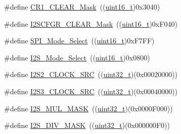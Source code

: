 \begin{DoxyCompactItemize}
\item 
\#define \hyperlink{group___s_p_i___private___defines_ga67f7dd35ea3d1296677e5fc50b88fa90}{C\+R1\+\_\+\+C\+L\+E\+A\+R\+\_\+\+Mask}~((\hyperlink{_p_e___types_8h_a1f1825b69244eb3ad2c7165ddc99c956}{uint16\+\_\+t})0x3040)
\item 
\#define \hyperlink{group___s_p_i___private___defines_ga6cd1ac4e83d8de8e32a407d1a7971389}{I2\+S\+C\+F\+G\+R\+\_\+\+C\+L\+E\+A\+R\+\_\+\+Mask}~((\hyperlink{_p_e___types_8h_a1f1825b69244eb3ad2c7165ddc99c956}{uint16\+\_\+t})0x\+F040)
\item 
\#define \hyperlink{group___s_p_i___private___defines_ga71da9dd90bf7bfb6ed1748a1e181677a}{S\+P\+I\+\_\+\+Mode\+\_\+\+Select}~((\hyperlink{_p_e___types_8h_a1f1825b69244eb3ad2c7165ddc99c956}{uint16\+\_\+t})0x\+F7\+F\+F)
\item 
\#define \hyperlink{group___s_p_i___private___defines_ga196b1b58421a7ee7dba0b46fb33c621b}{I2\+S\+\_\+\+Mode\+\_\+\+Select}~((\hyperlink{_p_e___types_8h_a1f1825b69244eb3ad2c7165ddc99c956}{uint16\+\_\+t})0x0800)
\item 
\#define \hyperlink{group___s_p_i___private___defines_gae1190efd6dbcd06a9c03f4d499d28e4c}{I2\+S2\+\_\+\+C\+L\+O\+C\+K\+\_\+\+S\+RC}~((\hyperlink{_p_e___types_8h_a33594304e786b158f3fb30289278f5af}{uint32\+\_\+t})(0x00020000))
\item 
\#define \hyperlink{group___s_p_i___private___defines_gabb67971448c15090f3372e3875db3d23}{I2\+S3\+\_\+\+C\+L\+O\+C\+K\+\_\+\+S\+RC}~((\hyperlink{_p_e___types_8h_a33594304e786b158f3fb30289278f5af}{uint32\+\_\+t})(0x00040000))
\item 
\#define \hyperlink{group___s_p_i___private___defines_gaf9cca755995c8e8f7a4012709ca468f2}{I2\+S\+\_\+\+M\+U\+L\+\_\+\+M\+A\+SK}~((\hyperlink{_p_e___types_8h_a33594304e786b158f3fb30289278f5af}{uint32\+\_\+t})(0x0000\+F000))
\item 
\#define \hyperlink{group___s_p_i___private___defines_ga26cdb43c45ac655c792c5af0a6bbb0bf}{I2\+S\+\_\+\+D\+I\+V\+\_\+\+M\+A\+SK}~((\hyperlink{_p_e___types_8h_a33594304e786b158f3fb30289278f5af}{uint32\+\_\+t})(0x000000\+F0))
\end{DoxyCompactItemize}
